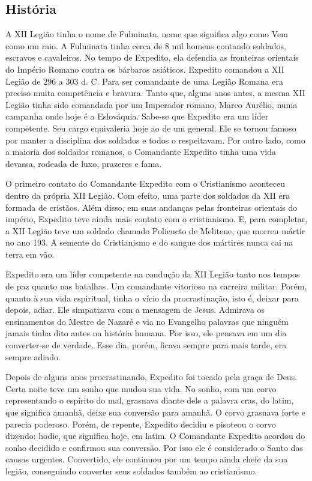 \documentclass[18pt]{article}
\begin{document}
\begin{justify}

 \begin{center}
  \section{História}\label{sec:História} %
 \end{center}

A XII Legião tinha o nome de Fulminata, nome que significa algo como Vem como um raio. A Fulminata tinha cerca de 8 mil homens contando soldados, escravos e cavaleiros. No tempo de Expedito, ela defendia as fronteiras orientais do Império Romano contra os bárbaros asiáticos. Expedito comandou a XII Legião de 296 a 303 d. C. Para ser comandante de uma Legião Romana era preciso muita competência e bravura. Tanto que, alguns anos antes, a mesma XII Legião tinha sido comandada por um Imperador romano, Marco Aurélio, numa campanha onde hoje é a Eslováquia. Sabe-se que Expedito era um líder competente. Seu cargo equivaleria hoje ao de um general. Ele se tornou famoso por manter a disciplina dos soldados e todos o respeitavam. Por outro lado, como a maioria dos soldados romanos, o Comandante Expedito tinha uma vida devassa, rodeada de luxo, prazeres e fama.

O primeiro contato do Comandante Expedito com o Cristianismo aconteceu dentro da própria XII Legião. Com efeito, uma parte dos soldados da XII era formada de cristãos. Além disso, em suas andanças pelas fronteiras orientais do império, Expedito teve ainda mais contato com o cristianismo. E, para completar, a XII Legião teve um soldado chamado Polieucto de Melitene, que morreu mártir no ano 193. A semente do Cristianismo e do sangue dos mártires nunca cai na terra em vão.

Expedito era um líder competente na condução da XII Legião tanto nos tempos de paz quanto  nas batalhas. Um comandante vitorioso na carreira militar. Porém, quanto à sua vida espiritual, tinha o vício da procrastinação, isto é, deixar para depois, adiar. Ele simpatizava com a mensagem de Jesus. Admirava os ensinamentos do Mestre de Nazaré e via no Evangelho palavras que ninguém jamais tinha dito antes na história humana. Por isso, ele pensava em um dia converter-se de verdade. Esse dia, porém, ficava sempre para mais tarde, era sempre adiado.

Depois de alguns anos procrastinando, Expedito foi tocado pela graça de Deus. Certa noite teve um sonho que mudou sua vida. No sonho, com um corvo representando o espírito do mal, grasnava diante dele a palavra cras, do latim, que significa amanhã, deixe sua conversão para amanhã. O corvo grasnava forte e parecia poderoso. Porém, de repente, Expedito decidiu e pisoteou o corvo dizendo: hodie, que significa hoje, em latim. O Comandante Expedito acordou do sonho decidido e confirmou sua conversão. Por isso ele é considerado o Santo das causas urgentes. Convertido, ele continuou por um tempo ainda chefe da sua legião, conseguindo converter seus soldados também ao cristianismo.


\end{justify}
\end{document}
